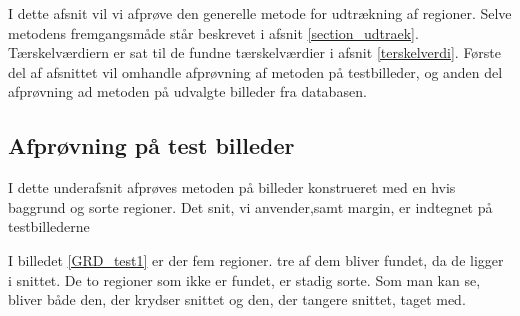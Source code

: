 
{\sffamily I dette afsnit vil vi afprøve den generelle metode for udtrækning af
regioner. Selve metodens fremgangsmåde står beskrevet i afsnit
\ref{section_udtraek}. Tærskelværdiern er sat til de fundne
tærskelværdier i afsnit \ref{terskelverdi}. Første del af afsnittet vil
omhandle afprøvning af metoden på testbilleder, og anden del afprøvning
ad metoden på udvalgte billeder fra databasen.}

\subsection{Afprøvning på test billeder}
I dette underafsnit afprøves metoden på billeder konstrueret med en hvis
baggrund og sorte regioner. Det snit, vi anvender,samt margin, er
indtegnet på testbillederne

I billedet \ref{GRD_test1} er der fem regioner. tre af dem bliver
fundet, da de ligger i snittet. De to regioner som ikke er fundet, er
stadig sorte. Som man kan se, bliver både den, der krydser snittet og den,
der tangere snittet, taget med. 

\begin{figure}[!h]
    \centering
    	\hspace{1em}
		\hspace{1em}
        \caption[]{}
     \label{GRD_test1_sammen}
\end{figure}

